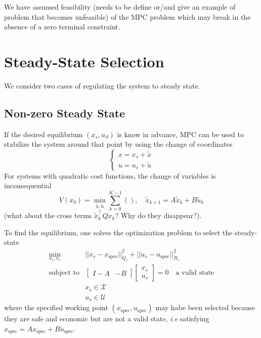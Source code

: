 \documentclass[11pt]{report}
\newcommand{\bs}[1]{\boldsymbol{#1}}
\newcommand{\bsu}{\bs{\mathrm{u}}}
\newcommand{\bsx}{\bs{\mathrm{x}}}
\begin{document}
We have assumed feasibility (needs to be define or/and give an example of problem that becomes unfeasible) of the MPC problem which may break in the absence of a zero terminal constraint.

\section{Steady-State Selection}
\label{sec:steady-state-selection}

We consider two cases of regulating the system to steady state.

\subsection{Non-zero Steady State}
\label{sec:nonzero-steady-state}

If the desired equilibrium $(x_s,u_S)$ is know in advance, MPC can be used to stabilize the system around that point by using the change of coordinates
\begin{equation*}
  \begin{cases}
    x = x_s + \tilde{x} \\
    u = u_s + \tilde{u}
  \end{cases}
\end{equation*}
For systems with quadratic cost functions, the change of variables is inconsequential
\begin{equation*}
  V(x_0) = \min_{\tilde{\bsx},\tilde{\bsu}} \sum_{k=0}^{K-1} \left(\right),\quad \tilde{x}_{k+1} = A\tilde{x}_k + B\tilde{u}_k
\end{equation*}
(what about the cross terms $\tilde{x}_k^\top Qx_k$? Why do they disappear?).

To find the equilibrium, one solves the optimization problem to select the steady-state
\begin{align*}
  \min_{u_s,u_s} & ||x_s-x_\text{spec}||_{Q_s}^2 + ||u_s-u_\text{spec}||_{R_s}^2 \\
  \text{subject to} &
                      \begin{bmatrix}
                        I-A & -B
                      \end{bmatrix}
                      \begin{bmatrix}
                        x_s \\ u_s
                      \end{bmatrix} = 0\quad \text{a valid state} \\
  & x_s \in \mathcal{X} \\
  & u_s \in \mathcal{U}
\end{align*}
where the specified working point $(x_\text{spec},u_\text{spec})$ may habe been selected because they are safe and economic but are not a valid state, \textit{i.e} satisfying $x_\text{spec} = Ax_\text{spec}+Bu_\text{spec}$.
\end{document}
